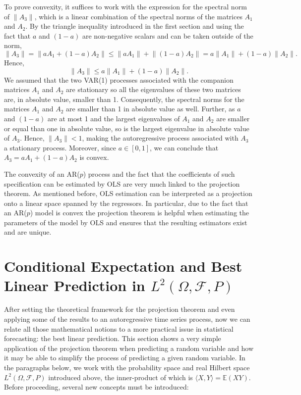 \documentclass{article}
\begin{document}
To prove convexity, it suffices to work with the expression for the spectral norm of $\lVert A_3 \rVert$, which is a linear combination of the spectral norms of the matrices $A_1$ and $A_2$. By the triangle inequality introduced in the first section and using the fact that $a$ and $(1 - a)$ are non-negative scalars and can be taken outside of the norm, 
\[
\lVert A_3 \rVert = \lVert aA_1 + (1 - a)A_2 \rVert \leqslant \lVert aA_1 \rVert + \lVert (1 - a)A_2 \rVert = a \lVert A_1 \rVert + (1 - a) \lVert A_2 \rVert.
\]
Hence,
\[
\lVert A_3 \rVert \leqslant a \lVert A_1 \rVert + (1 - a) \lVert A_2 \rVert.
\]
We assumed that the two VAR(1) processes associated with the companion matrices $A_1$ and $A_2$ are stationary so all the eigenvalues of these two matrices are, in absolute value, smaller than 1. Consequently, the spectral norms for the matrices $A_1$ and $A_2$ are smaller than 1 in absolute value as well. Further, as $a$ and $(1 - a)$ are at most 1 and the largest eigenvalues of $A_1$ and $A_2$ are smaller or equal than one in absolute value, so is the largest eigenvalue in absolute value of $A_3$. Hence, $\lVert A_3 \rVert < 1$, making the autoregressive process associated with $A_3$ a stationary process. Moreover, since $a \in [0, 1]$, we can conclude that $A_3 = aA_1 + (1 - a)A_2$ is convex. \newline

The convexity of an AR($p$) process and the fact that the coefficients of such specification can be estimated by OLS are very much linked to the projection theorem. As mentioned before, OLS estimation can be interpreted as a projection onto a linear space spanned by the regressors. In particular, due to the fact that an AR($p$) model is convex the projection theorem is helpful when estimating the parameters of the model by OLS and ensures that the resulting estimators exist and are unique. 

\newpage

\section{Conditional Expectation and Best Linear Prediction in $L^2(\Omega, \mathscr{F}, P)$}

After setting the theoretical framework for the projection theorem and even applying some of the results to an autoregressive time series process, now we can relate all those mathematical notions to a more practical issue in statistical forecasting: the best linear prediction. This section shows a very simple application of the projection theorem when predicting a random variable and how it may be able to simplify the process of predicting a given random variable. In the paragraphs below, we work with the probability space and real Hilbert space $L^2(\Omega, \mathscr{F}, P)$ introduced above, the inner-product of which is $\langle X, Y \rangle = \mathbb E(XY)$. Before proceeding, several new concepts must be introduced: \newline
\end{document}

